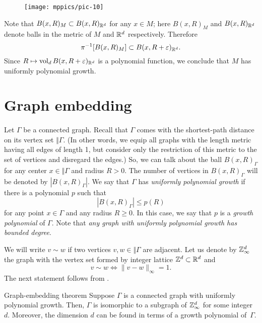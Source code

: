 \documentclass[a4paper,10pt]{article}
\begin{document}
{

\begin{wrapfigure}{o}{45 mm}
\vskip-14mm
\centering
\texttt{[image: mppics/pic-10]}
\vskip5mm
\end{wrapfigure}

Note that $B(x,R)_M\subset B(x,R)_{\mathbb{R}^d}$ for any $x\in M$;
here $B(x,R)_M$ and $B(x,R)_{\mathbb{R}^d}$ denote balls in the metric of $M$ and $\mathbb{R}^d$ respectively.
Therefore 
\[\pi^{-1}[B(x,R)_M]\subset B(x,R+\varepsilon)_{\mathbb{R}^d}.\]
Since $R\mapsto \operatorname{\rm vol}_d B(x,R+\varepsilon)_{\mathbb{R}^d}$ is a polynomial function, we conclude that $M$ has uniformly  polynomial growth.
\qeds

}

\section*{Graph embedding}

\paragraph{}\label{par:graph-embedding}
Let $\Gamma$ be a connected graph.
Recall that $\Gamma$ comes with the shortest-path distance on its vertex set $\Vert \Gamma$.
(In other words, we equip all graphs with the length metric having all edges of length 1, but consider only the restriction of this metric to the set of vertices and disregard the edges.)
So, we can talk about the ball $B(x,R)_\Gamma$ for any center $x\in \Vert \Gamma$ and radius $R>0$.
The number of vertices in $B(x,R)_\Gamma$ will be denoted by $|B(x,R)_\Gamma|$.
We say that $\Gamma$ has \emph{uniformly polynomial growth} if there is a polynomial $p$ such that 
\[|B(x,R)_\Gamma|\le p(R)\]
for any point $x\in \Gamma$ and any radius $R\ge 0$.
In this case, we say that $p$ is a \emph{growth polynomial} of $\Gamma$.
Note that \textit{any graph with uniformly polynomial growth has bounded degree}.

We will write $v\sim w$ if two vertices $v,w\in \Vert \Gamma$ are adjacent.
Let us denote by $\mathbb{Z}^d_\infty$ the graph with the vertex set formed by integer lattice $\mathbb{Z}^d\subset \mathbb{R}^d$ and
\[v\sim w \iff  \|v-w\|_\infty=1.\]
The next statement follows from \cite[Theorem 5.5]{krauthgamer-lee1}.

\begin{thm}{Graph-embedding theorem}\label{thm:graph-embedding}
Suppose $\Gamma$ is a connected graph with uniformly polynomial growth.
Then, $\Gamma$ is isomorphic to a subgraph of $\mathbb{Z}^d_\infty$ for some integer~$d$.
Moreover, the dimension $d$ can be found in terms of a growth polynomial of~$\Gamma$.
\end{thm}
\end{document}

